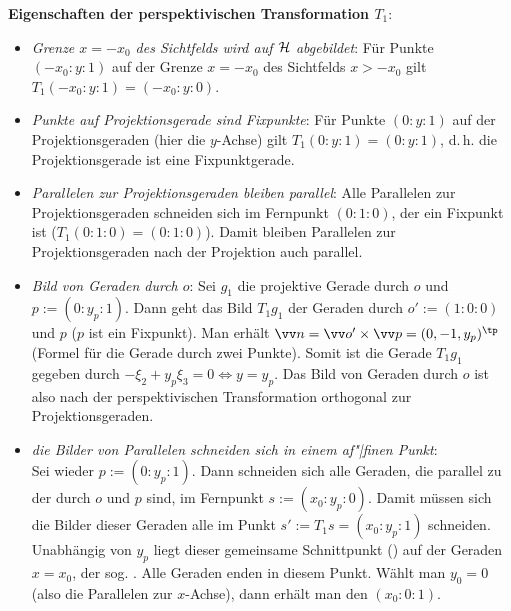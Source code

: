 \linie

\textbf{Eigenschaften der perspektivischen Transformation $T_1$}:
\begin{itemize}
    \item
    \emph{Grenze $x = -x_0$ des Sichtfelds wird auf $\mathcal{H}$ abgebildet}:
    Für Punkte $(-x_0:y:1)$ auf der Grenze $x = -x_0$ des Sichtfelds $x > -x_0$ gilt
    $T_1 (-x_0:y:1) = (-x_0:y:0)$.

    \item
    \emph{Punkte auf Projektionsgerade sind Fixpunkte}:
    Für Punkte $(0:y:1)$ auf der Projektionsgeraden (hier die $y$-Achse) gilt
    $T_1 (0:y:1) = (0:y:1)$, d.\,h. die Projektionsgerade ist eine Fixpunktgerade.

    \item
    \emph{Parallelen zur Projektionsgeraden bleiben parallel}:
    Alle Parallelen zur Projektionsgeraden schneiden sich im Fernpunkt $(0:1:0)$,
    der ein Fixpunkt ist ($T_1 (0:1:0) = (0:1:0)$).
    Damit bleiben Parallelen zur Projektionsgeraden nach der Projektion auch parallel.

    \item
    \emph{Bild von Geraden durch $o$}:
    Sei $g_1$ die projektive Gerade durch $o$ und $p := (0:y_p:1)$.
    Dann geht das Bild $T_1 g_1$ der Geraden durch $o' := (1:0:0)$ und $p$ ($p$ ist ein Fixpunkt).
    Man erhält $\vec{n} = \vec{o}' \times \vec{p} = (0, -1, y_p)^\tp$
    (Formel für die Gerade durch zwei Punkte).
    Somit ist die Gerade $T_1 g_1$ gegeben durch $-\xi_2 + y_p \xi_3 = 0 \iff y = y_p$.
    Das Bild von Geraden durch $o$ ist also nach der perspektivischen Transformation orthogonal
    zur Projektionsgeraden.

    \item
    \emph{die Bilder von Parallelen schneiden sich in einem af"|finen Punkt}:\\
    Sei wieder $p := (0:y_p:1)$.
    Dann schneiden sich alle Geraden, die parallel zu der durch $o$ und $p$ sind,
    im Fernpunkt $s := (x_0:y_p:0)$.
    Damit müssen sich die Bilder dieser Geraden alle im Punkt $s' := T_1 s = (x_0:y_p:1)$ schneiden.
    Unabhängig von $y_p$ liegt dieser gemeinsame Schnittpunkt ()
    auf der Geraden $x = x_0$, der sog. .
    Alle Geraden enden in diesem Punkt.
    Wählt man $y_0 = 0$ (also die Parallelen zur $x$-Achse), dann erhält man den
     $(x_0:0:1)$.
\end{itemize}

\pagebreak

